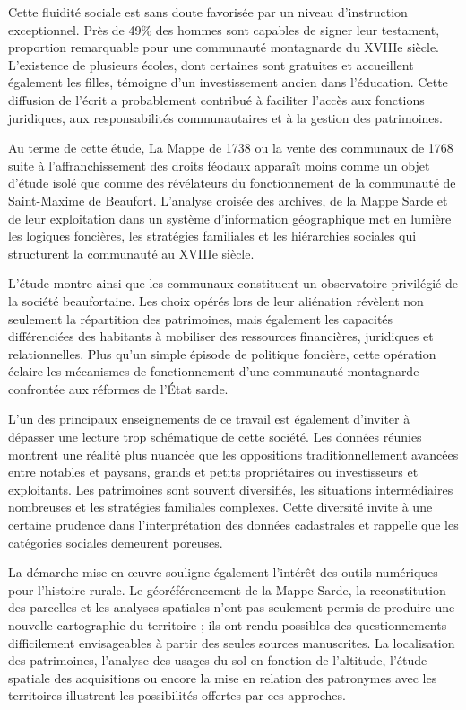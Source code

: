 \documentclass[12pt,a4paper]{report}
\begin{document}
Cette fluidité sociale est sans doute favorisée par un niveau d'instruction exceptionnel. Près de 49\% des hommes sont capables de signer leur testament, proportion remarquable pour une communauté montagnarde du XVIIIe siècle. L'existence de plusieurs écoles, dont certaines sont gratuites et accueillent également les filles, témoigne d'un investissement ancien dans l'éducation. Cette diffusion de l'écrit a probablement contribué à faciliter l'accès aux fonctions juridiques, aux responsabilités communautaires et à la gestion des patrimoines.



Au terme de cette étude, La Mappe de 1738 ou la vente des communaux de 1768 suite à l'affranchissement des droits féodaux apparaît moins comme un objet d'étude isolé que comme des révélateurs du fonctionnement de la communauté de Saint-Maxime de Beaufort. L'analyse croisée des archives, de la Mappe Sarde et de leur exploitation dans un système d'information géographique met en lumière les logiques foncières, les stratégies familiales et les hiérarchies sociales qui structurent la communauté au XVIIIe siècle.

L'étude montre ainsi que les communaux constituent un observatoire privilégié de la société beaufortaine. Les choix opérés lors de leur aliénation révèlent non seulement la répartition des patrimoines, mais également les capacités différenciées des habitants à mobiliser des ressources financières, juridiques et relationnelles. Plus qu'un simple épisode de politique foncière, cette opération éclaire les mécanismes de fonctionnement d'une communauté montagnarde confrontée aux réformes de l'État sarde.

L'un des principaux enseignements de ce travail est également d'inviter à dépasser une lecture trop schématique de cette société. Les données réunies montrent une réalité plus nuancée que les oppositions traditionnellement avancées entre notables et paysans, grands et petits propriétaires ou investisseurs et exploitants. Les patrimoines sont souvent diversifiés, les situations intermédiaires nombreuses et les stratégies familiales complexes. Cette diversité invite à une certaine prudence dans l'interprétation des données cadastrales et rappelle que les catégories sociales demeurent poreuses.

La démarche mise en œuvre souligne également l'intérêt des outils numériques pour l'histoire rurale. Le géoréférencement de la Mappe Sarde, la reconstitution des parcelles et les analyses spatiales n'ont pas seulement permis de produire une nouvelle cartographie du territoire ; ils ont rendu possibles des questionnements difficilement envisageables à partir des seules sources manuscrites. La localisation des patrimoines, l'analyse des usages du sol en fonction de l'altitude, l'étude spatiale des acquisitions ou encore la mise en relation des patronymes avec les territoires illustrent les possibilités offertes par ces approches.
\end{document}
